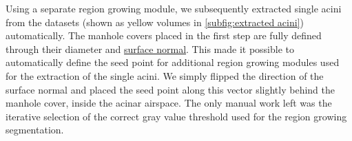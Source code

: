 \documentclass[%
	paper=a4,%
	abstract=true,%
	]{scrartcl}
\newcommand{\imsize}{\linewidth}
\newlength\imagewidth		%
\newlength\imagescale		%
\begin{document}
Using a separate region growing module, we subsequently extracted single acini from the datasets (shown as yellow volumes in \autoref{subfig:extracted acini}) automatically. The manhole covers placed in the first step are fully defined through their diameter and \href{https://secure.wikimedia.org/wikipedia/en/w/index.php?title=Surface_normal&oldid=411684319}{surface normal}. This made it possible to automatically define the seed point for additional region growing modules used for the extraction of the single acini. We simply flipped the direction of the surface normal and placed the seed point along this vector slightly behind the manhole cover, inside the acinar airspace. The only manual work left was the iterative selection of the correct gray value threshold used for the region growing segmentation.

\renewcommand{\imsize}{.333\linewidth}
\pgfmathsetlength{\imagewidth}{\imsize}%
%
\def\x{50}%
\def\y{916+20}%
\end{document}
